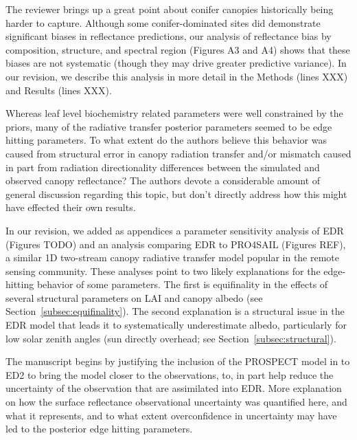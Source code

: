 The reviewer brings up a great point about conifer canopies historically being harder to capture.
Although some conifer-dominated sites did demonstrate significant biases in reflectance predictions, our analysis of reflectance bias by composition, structure, and spectral region (Figures A3 and A4) shows that these biases are not systematic (though they may drive greater predictive variance).
In our revision, we describe this analysis in more detail in the Methods (lines XXX) and Results (lines XXX).

\begin{reviewer}
  Whereas leaf level biochemistry related parameters were well constrained by the priors, many of the radiative transfer posterior parameters seemed to be edge hitting parameters.
  To what extent do the authors believe this behavior was caused from structural error in canopy radiation transfer and/or mismatch caused in part from radiation directionality differences between the simulated and observed canopy reflectance?
  The authors devote a considerable amount of general discussion regarding this topic, but don’t directly address how this might have effected their own results.
\end{reviewer}

In our revision, we added as appendices a parameter sensitivity analysis of EDR (Figures TODO) and an analysis comparing EDR to PRO4SAIL (Figures REF), a similar 1D two-stream canopy radiative transfer model popular in the remote sensing community.
These analyses point to two likely explanations for the edge-hitting behavior of some parameters.
The first is equifinality in the effects of several structural parameters on LAI and canopy albedo (see Section~\ref{subsec:equifinality}).
The second explanation is a structural issue in the EDR model that leads it to systematically underestimate albedo, particularly for low solar zenith angles (sun directly overhead; see Section~\ref{subsec:structural}).

\begin{reviewer}
  The manuscript begins by justifying the inclusion of the PROSPECT model in to ED2 to bring the model closer to the observations, to, in part help reduce the uncertainty of the observation that are assimilated into EDR.\@
  More explanation on how the surface reflectance observational uncertainty was quantified here, and what it represents, and to what extent overconfidence in uncertainty may have led to the posterior edge hitting parameters.
\end{reviewer}


